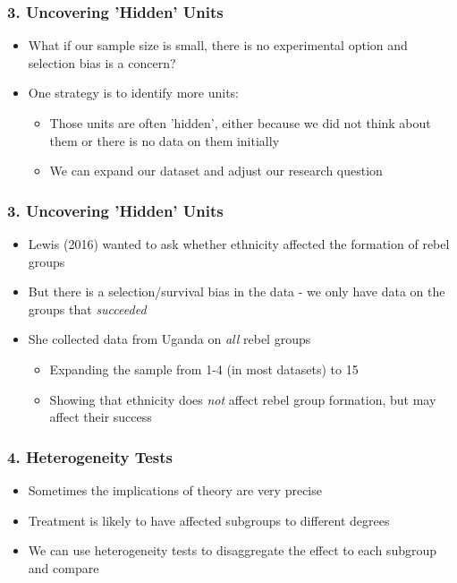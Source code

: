 \documentclass[xcolor=x11names,compress]{beamer}\usepackage[]{graphicx}\usepackage[]{color}
\renewcommand{\(}{\begin{columns}}
\renewcommand{\)}{\end{columns}}
\newcommand{\<}[1]{\begin{column}{#1}}
\renewcommand{\>}{\end{column}}
\begin{document}
\begin{frame}
\frametitle{3. Uncovering 'Hidden' Units}
\begin{itemize}
\item What if our sample size is small, there is no experimental option and selection bias is a concern? 
\pause
\item One strategy is to identify more units:
\pause
\begin{itemize}
\item Those units are often 'hidden', either because we did not think about them or there is no data on them initially
\pause
\item We can expand our dataset and adjust our research question
\end{itemize}
\end{itemize}
\end{frame}

\begin{frame}
\frametitle{3. Uncovering 'Hidden' Units}
\begin{itemize}
\item Lewis (2016) wanted to ask whether ethnicity affected the formation of rebel groups
\pause
\item But there is a selection/survival bias in the data - we only have data on the groups that \textit{succeeded}
\pause
\item She collected data from Uganda on \textit{all} rebel groups
\pause
\begin{itemize}
\item Expanding the sample from 1-4 (in most datasets) to 15
\pause
\item Showing that ethnicity does \textit{not} affect rebel group formation, but may affect their success
\end{itemize}
\end{itemize}
\end{frame}



\begin{frame}
\frametitle{4. Heterogeneity Tests}
\begin{itemize}
\item Sometimes the implications of theory are very precise
\pause
\item Treatment is likely to have affected subgroups to different degrees
\pause
\item We can use heterogeneity tests to disaggregate the effect to each subgroup and compare
\end{itemize}
\end{frame}
\end{document}
